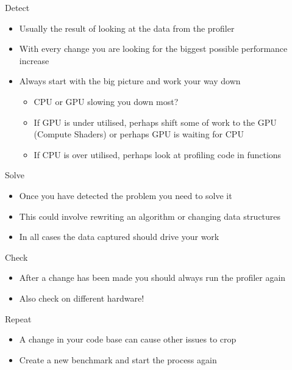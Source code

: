 \begin{frame}{Detect}
	\begin{itemize}
		\pause \item Usually the result of looking at the data from the profiler
		\pause \item With every change you are looking for the biggest possible performance increase
		\pause \item Always start with the big picture and work your way down
		\begin{itemize}
			\pause \item CPU or GPU slowing you down most?
			\pause \item If GPU is under utilised, perhaps shift some of work to the GPU (Compute Shaders) or perhaps GPU is waiting for CPU
			\pause \item If CPU is over utilised, perhaps look at profiling code in functions
		\end{itemize}
	\end{itemize}
\end{frame}

\begin{frame}{Solve}
	\begin{itemize}
		\pause \item Once you have detected the problem you need to solve it
		\pause \item This could involve rewriting an algorithm or changing data structures
		\pause \item In all cases the data captured should drive your work
	\end{itemize}
\end{frame}

\begin{frame}{Check}
	\begin{itemize}
		\pause \item After a change has been made you should always run the profiler again
		\pause \item Also check on different hardware!
	\end{itemize}
\end{frame}

\begin{frame}{Repeat}
	\begin{itemize}
		\pause \item A change in your code base can cause other issues to crop
		\pause \item Create a new benchmark and start the process again 
	\end{itemize}
\end{frame}

